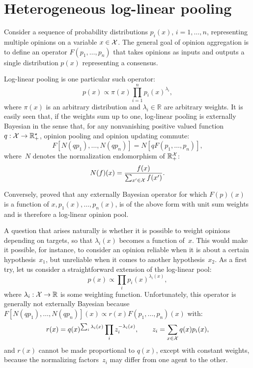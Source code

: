 \documentclass[english]{scrartcl}
\begin{document}
\section{Heterogeneous log-linear pooling}
\label{app:hetero}

Consider a sequence of probability distributions $p_i(x)$, $i=1,\ldots,n$, representing multiple opinions on a variable $x\in{\cal X}$. The general goal of opinion aggregation is to define an operator $F(p_1,\ldots,p_n)$ that takes opinions as inputs and outputs a single distribution $p(x)$ representing a consensus.

Log-linear pooling \cite{Genest-86} is one particular such operator:
$$
p(x)\propto \pi(x) \prod_{i=1}^n p_i(x)^{\lambda_i},
$$
where $\pi(x)$ is an arbitrary distribution and $\lambda_i\in\mathbb{R}$ are arbitrary weights. It is easily seen that, if the weights sum up to one, log-linear pooling is externally Bayesian in the sense that, for any nonvanishing positive valued function $q:{\cal X}\to \mathbb{R}^\star_+$, opinion pooling and opinion updating commute:
$$
F[N(q p_1), \ldots, N(q p_n)]
=
N[q F(p_1,\ldots, p_n)],
$$
where~$N$ denotes the normalization endomorphism of $\mathbb{R}_+^{\cal X}$:
$$
N(f)(x) = \frac{f(x)}{\sum_{x'\in{\cal X}} f(x')}
.
$$

Conversely, \cite{Genest-86b} proved that any externally Bayesian operator for which $F(p)(x)$ is a function of $x,p_1(x),\ldots,p_n(x)$, is of the above form with unit sum weights and is therefore a log-linear opinion pool. 

A question that arises naturally is whether it is possible to weight opinions depending on targets, so that $\lambda_i(x)$ becomes a function of~$x$. This would make it possible, for instance, to consider an opinion reliable when it is about a certain hypothesis~$x_1$, but unreliable when it comes to another hypothesis~$x_2$. As a first try, let us consider a straightforward extension of the log-linear pool: 
$$
p(x)\propto \prod_i p_i(x)^{\lambda_i(x)},
$$
where $\lambda_i : {\cal X}\to\mathbb{R}$ is some weighting function. Unfortunately, this operator is generally not externally Bayesian because $F[N(q p_1), \ldots, N(q p_n)](x)
\propto r(x) F(p_1,\ldots, p_n)(x)$ with:
$$
r(x) = q(x)^{\sum_i \lambda_i(x)} \prod_i z_i^{-\lambda_i(x)},
\qquad 
z_i = \sum_{x\in{\cal X}} q(x) p_i(x),
$$
and $r(x)$ cannot be made proportional to $q(x)$, except with constant weights, because the normalizing factors~$z_i$ may differ from one agent to the other.
\end{document}
